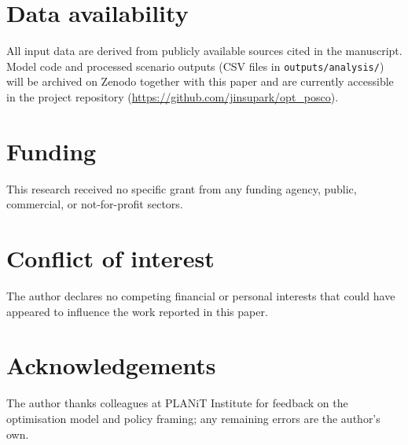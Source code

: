 \documentclass[preprint,1p,authoryear]{elsarticle}
\begin{document}
\section*{Data availability}
All input data are derived from publicly available sources cited in the manuscript. Model code and processed scenario outputs (CSV files in \texttt{outputs/analysis/}) will be archived on Zenodo together with this paper and are currently accessible in the project repository (\url{https://github.com/jinsupark/opt\_posco}).

\section*{Funding}
This research received no specific grant from any funding agency, public, commercial, or not-for-profit sectors.

\section*{Conflict of interest}
The author declares no competing financial or personal interests that could have appeared to influence the work reported in this paper.

\section*{Acknowledgements}
The author thanks colleagues at PLANiT Institute for feedback on the optimisation model and policy framing; any remaining errors are the author’s own.


\end{document}
